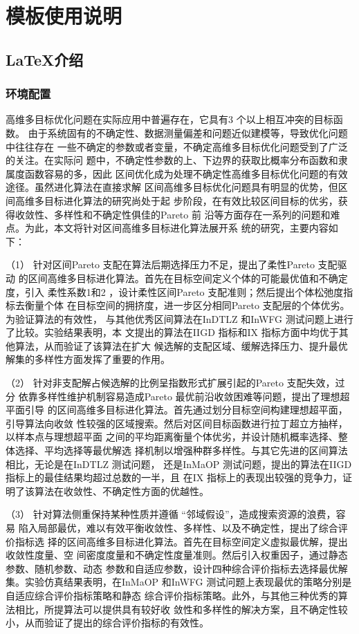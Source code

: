 \linespread{1.55}\selectfont
\chapter{模板使用说明}
\section{\LaTeX 介绍}
\subsection{环境配置}
高维多目标优化问题在实际应用中普遍存在，它具有3 个以上相互冲突的目标函数。
由于系统固有的不确定性、数据测量偏差和问题近似建模等，导致优化问题中往往存在
一些不确定的参数或者变量，不确定高维多目标优化问题受到了广泛的关注。在实际问
题中，不确定性参数的上、下边界的获取比概率分布函数和隶属度函数容易的多，因此
区间优化成为处理不确定性高维多目标优化问题的有效途径。虽然进化算法在直接求解
区间高维多目标优化问题具有明显的优势，但区间高维多目标进化算法的研究尚处于起
步阶段，在有效比较区间目标的优劣，获得收敛性、多样性和不确定性俱佳的Pareto 前
沿等方面存在一系列的问题和难点。为此，本文将针对区间高维多目标进化算法展开系
统的研究，主要内容如下：

（1） 针对区间Pareto 支配在算法后期选择压力不足，提出了柔性Pareto 支配驱动
的区间高维多目标进化算法。首先在目标空间定义个体的可能最优值和不确定度，引入
柔性系数1和2 ，设计柔性区间Pareto 支配准则；然后提出个体松弛度指标去衡量个体
在目标空间的拥挤度，进一步区分相同Pareto 支配层的个体优劣。为验证算法的有效性，
与其他优秀区间算法在InDTLZ 和InWFG 测试问题上进行了比较。实验结果表明，本
文提出的算法在IIGD 指标和IX 指标方面中均优于其他算法，从而验证了该算法在扩大
候选解的支配区域、缓解选择压力、提升最优解集的多样性方面发挥了重要的作用。

（2） 针对非支配解占候选解的比例呈指数形式扩展引起的Pareto 支配失效，过分
依靠多样性维护机制容易造成Pareto 最优前沿收敛困难等问题，提出了理想超平面引导
的区间高维多目标进化算法。首先通过划分目标空间构建理想超平面，引导算法向收敛
性较强的区域搜索。然后对区间目标函数进行拉丁超立方抽样，以样本点与理想超平面
之间的平均距离衡量个体优劣，并设计随机概率选择、整体选择、平均选择等最优解选
择机制以增强种群多样性。与其它先进的区间算法相比，无论是在InDTLZ 测试问题，
还是InMaOP 测试问题，提出的算法在IIGD 指标上的最佳结果均超过总数的一半，且
在IX 指标上的表现出较强的竞争力，证明了该算法在收敛性、不确定性方面的优越性。

（3） 针对算法侧重保持某种性质并遵循 “邻域假设”，造成搜索资源的浪费，容易
陷入局部最优，难以有效平衡收敛性、多样性、以及不确定性，提出了综合评价指标选
择的区间高维多目标进化算法。首先在目标空间定义虚拟最优解，提出收敛性度量、空
间密度度量和不确定性度量准则。然后引入权重因子，通过静态参数、随机参数、动态
参数和自适应参数，设计四种综合评价指标去选择最优解集。实验仿真结果表明，在InMaOP 和InWFG 测试问题上表现最优的策略分别是自适应综合评价指标策略和静态
综合评价指标策略。此外，与其他三种优秀的算法相比，所提算法可以提供具有较好收
敛性和多样性的解决方案，且不确定性较小，从而验证了提出的综合评价指标的有效性。

